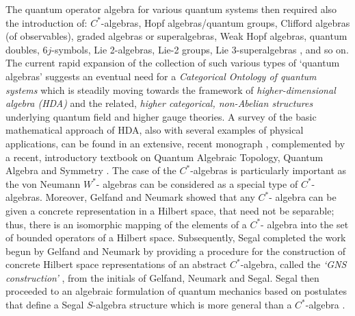 \documentclass[12pt]{article}
\theoremstyle{plain}
\theoremstyle{definition}
\numberwithin{equation}{section}
\begin{document}
The quantum operator algebra for various quantum systems then required also the introduction of: $C^*$-algebras, Hopf algebras/quantum groups, Clifford algebras (of observables), graded algebras or superalgebras, Weak Hopf algebras, quantum doubles, $6j$-symbols, Lie 2-algebras, Lie-2 groups, Lie 3-superalgebras \cite{Baez-Huerta2010}, and so on.  The current rapid expansion of the collection of such various types of `quantum algebras' suggests an eventual need for a {\em Categorical Ontology of quantum systems} which is steadily moving towards the framework of \emph{higher-dimensional algebra (HDA)} and the related, \emph{higher categorical, non-Abelian structures} underlying quantum field and higher gauge theories.  A survey of the basic mathematical approach of HDA,  also with several  examples of physical applications, can be found in an extensive, recent monograph \cite{BGB1}, complemented by a recent, introductory textbook on Quantum Algebraic Topology, Quantum Algebra and Symmetry \cite{Baianu2010}. The case of the $C^*$-algebras is particularly important as the von Neumann $W^*$- algebras can be considered as a special type of $C^*$-algebras. Moreover, Gelfand  and  Neumark \cite{Gelfand-Naimark43}  showed that any $C^*$- algebra can be given a concrete representation in a Hilbert space, that need not be separable; thus, there is an isomorphic mapping of the elements of a $C^*$- algebra into the set of bounded operators of a Hilbert space. Subsequently, Segal \cite{Segal47b} completed the work begun by Gelfand and Neumark by providing a procedure for the construction of concrete Hilbert space representations of an abstract $C^*$-algebra, called the {\em `GNS construction'} \cite{Segal47a}, from the initials of Gelfand, Neumark and Segal. Segal then proceeded to an algebraic formulation of quantum mechanics based on postulates that define a Segal $S$-algebra structure which is more general than a $C^*$-algebra \cite{Segal47b}.
\end{document}

